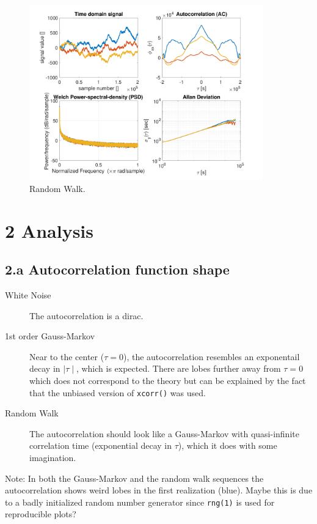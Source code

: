 \documentclass{article}
\begin{document}
\begin{figure}[H]
    \centering
    \includegraphics[width=0.9\textwidth]{random_walk}
    \caption{Random Walk.}
    \label{fig:random_walk}
\end{figure}

\section*{2 Analysis}
\subsection*{2.a Autocorrelation function shape}
\begin{description}
    \item[White Noise] The autocorrelation is a dirac.
    \item[1st order Gauss-Markov] Near to the center ($\tau=0$), the autocorrelation resembles an exponentail decay in $\mid\tau\mid$, which is expected. There are lobes further away from $\tau=0$ which does not correspond to the theory but can be explained by the fact that the unbiased version of \verb'xcorr()' was used.
    \item[Random Walk] The autocorrelation should look like a Gauss-Markov with quasi-infinite correlation time (exponential decay in $\tau$), which it does with some imagination.
\end{description}
Note: In both the Gauss-Markov and the random walk sequences the autocorrelation shows weird lobes in the first realization (blue).
Maybe this is due to a badly initialized random number generator since \verb'rng(1)' is used for reproducible plots?
\end{document}
